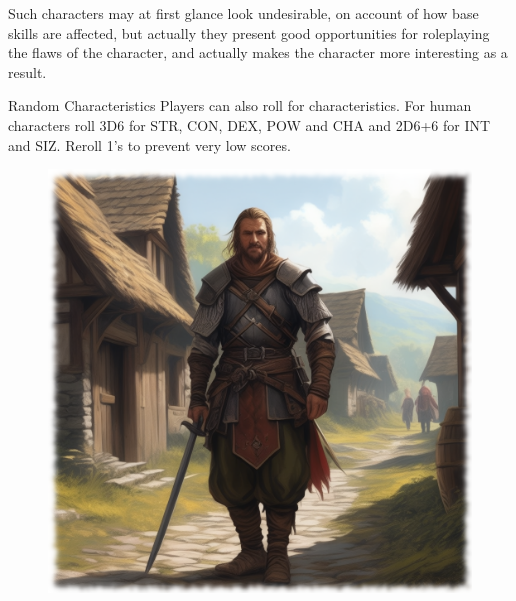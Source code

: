 Such characters may at first glance look undesirable, on account of how base skills are affected, but actually they present good opportunities for roleplaying the flaws of the character, and actually makes the character more interesting as a result.

\vspace{3mm}
\begin{rpg-titlebox}{Random Characteristics}
Players can also roll for characteristics. For human characters roll 3D6 for STR, CON, DEX, POW and CHA and 2D6+6 for INT and SIZ. Reroll 1's to prevent very low scores.
\end{rpg-titlebox}



\begin{figure}%
\begin{center}
  \includegraphics[scale=0.22]{img/ai-images/human-warrior.png}
\end{center}
\end{figure}

